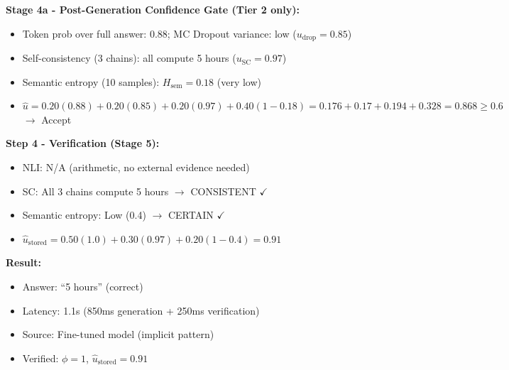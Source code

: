\documentclass[12pt,a4paper]{article}
\theoremstyle{definition}
\newcommand{\uhat}{\hat{u}}
\newcommand{\ustored}{\hat{u}_{\text{stored}}}
\begin{document}
\begin{examplebox}[title=Tier 2: Fine-Tuned Model Generation]
\textbf{Stage 4a - Post-Generation Confidence Gate (Tier 2 only):}
\begin{itemize}
    \item Token prob over full answer: 0.88; MC Dropout variance: low ($u_{\text{drop}} = 0.85$)
    \item Self-consistency (3 chains): all compute 5 hours ($u_{\text{SC}} = 0.97$)
    \item Semantic entropy (10 samples): $H_{\text{sem}} = 0.18$ (very low)
    \item $\uhat = 0.20(0.88) + 0.20(0.85) + 0.20(0.97) + 0.40(1{-}0.18) = 0.176 + 0.17 + 0.194 + 0.328 = 0.868 \geq 0.6$ $\rightarrow$ Accept
\end{itemize}

\textbf{Step 4 - Verification (Stage 5):}
\begin{itemize}
    \item NLI: N/A (arithmetic, no external evidence needed)
    \item SC: All 3 chains compute 5 hours $\rightarrow$ CONSISTENT $\checkmark$
    \item Semantic entropy: Low (0.4) $\rightarrow$ CERTAIN $\checkmark$
    \item $\ustored = 0.50(1.0) + 0.30(0.97) + 0.20(1{-}0.4) = 0.91$
\end{itemize}

\textbf{Result:}
\begin{itemize}
    \item Answer: ``5 hours'' (correct)
    \item Latency: 1.1s (850ms generation + 250ms verification)
    \item Source: Fine-tuned model (implicit pattern)
    \item Verified: $\phi = 1$, $\ustored = 0.91$
\end{itemize}
\end{examplebox}
\end{document}
